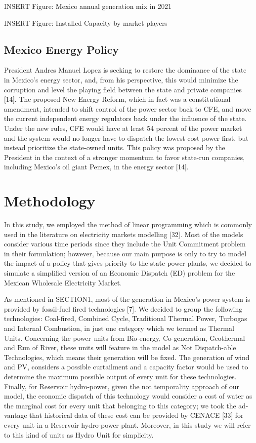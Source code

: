 \documentclass[eng]{ajceam-class}
\begin{document}
INSERT Figure: Mexico annual generation mix in 2021

INSERT Figure: Installed Capacity by market players 

\subsection{Mexico Energy Policy}

President Andres Manuel Lopez is seeking to restore the dominance of the state in Mexico’s energy sector, and, from his perspective, this would minimize the corruption and level the playing field between the state and private companies [14]. The proposed New Energy Reform, which in fact was a constitutional amendment, intended to shift control of the power sector back to CFE, and move the current independent energy regulators back under the influence of the state. Under the new rules, CFE would have at least 54 percent of the power market and the system would no longer have to dispatch the lowest cost power first, but instead prioritize the state-owned units. This policy was proposed by the President in the context of a stronger momentum to favor state-run companies, including Mexico’s oil giant Pemex, in the energy sector [14].

\section{Methodology}

In this study, we employed the method of linear programming which is commonly used in the literature on electricity markets modelling [32]. Most of the models consider various time periods since they include the Unit Commitment problem in their formulation; however, because our main purpose is only to try to model the impact of a policy that gives priority to the state power plants, we decided to simulate a simplified version of an Economic Dispatch (ED) problem for the Mexican Wholesale Electricity Market. 

As mentioned in SECTION1, most of the generation in Mexico’s power system is provided by fossil-fuel fired technologies [7]. We decided to group the following technologies: Coal-fired, Combined Cycle, Traditional Thermal Power, Turbogas and Internal Combustion, in just one category which we termed as Thermal Units. Concerning the power units from Bio-energy, Co-generation, Geothermal and Run of River, these units will feature in the model as Not Dispatch-able Technologies, which means their generation will be fixed. The generation of wind and PV, considers a possible curtailment and a capacity factor would be used to determine the maximum possible output of every unit for these technologies. Finally, for Reservoir hydro-power, given the not temporality approach of our model, the economic dispatch of this technology would consider a cost of water as the marginal cost for every unit that belonging to this category; we took the ad-vantage that historical data of these cost can be provided by CENACE [33] for every unit in a Reservoir hydro-power plant. Moreover, in this study we will refer to this kind of units as Hydro Unit for simplicity.
\end{document}
